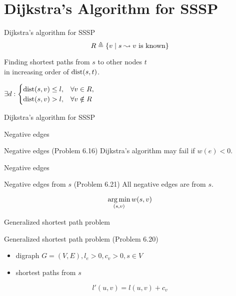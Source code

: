 \section{Dijkstra's Algorithm for SSSP}

\begin{frame}{Dijkstra's algorithm for SSSP}
  \[
	R \triangleq \{v \mid s \leadsto v \text{ is known}\}
  \]

  \vspace{0.50cm}
  \begin{center}
	Finding shortest paths from $s$ to other nodes $t$ \\
	in increasing order of $\text{dist}(s,t)$.
  \end{center}

  \begin{theorem}[Invariant]
	$\begin{displaystyle}
	  \exists d: \begin{cases}
		\dist(s,v) \le l, 	& \forall v \in R, \\
		\dist(s,v) > l, 	& \forall v \notin R
	  \end{cases}
	\end{displaystyle}$
  \end{theorem}
\end{frame}
\begin{frame}{Dijkstra's algorithm for SSSP}
\end{frame}
\begin{frame}{Negative edges}
  \begin{exampleblock}{Negative edges (Problem 6.16)}
	Dijkstra's algorithm may fail if $w(e) < 0$.
  \end{exampleblock}

\end{frame}
\begin{frame}{Negative edges}
  \begin{exampleblock}{Negative edges from $s$ (Problem 6.21)}
	All negative edges are from $s$.
  \end{exampleblock}

  \vspace{0.50cm}
  \[
	\operatorname*{arg\,min}_{(s,v)} w(s,v)
  \]
\end{frame}
\begin{frame}{Generalized shortest path problem}
  \begin{exampleblock}{Generalized shortest path problem (Problem 6.20)}
	\begin{itemize}
	  \item digraph $G = (V, E), l_e > 0, c_v > 0, s \in V$
	  \item shortest paths from $s$
	\end{itemize}
  \end{exampleblock}

  \[
	l'(u,v) = l(u,v) + c_v
  \]
\end{frame}

